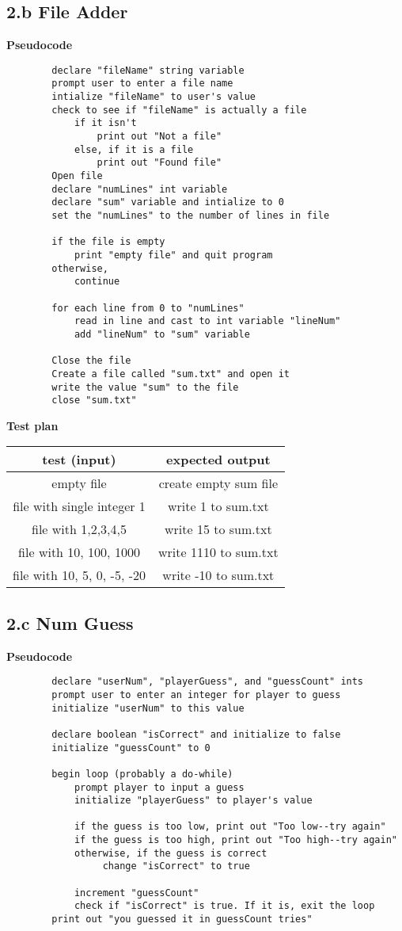 \documentclass[a4paper, 11pt]{article}
\begin{document}
\subsection*{2.b File Adder} 
	\textbf{Pseudocode} 
	\begin{lstlisting}
		declare "fileName" string variable 
		prompt user to enter a file name
		intialize "fileName" to user's value 
		check to see if "fileName" is actually a file 
			if it isn't 
				print out "Not a file" 
			else, if it is a file 
				print out "Found file" 
		Open file 
		declare "numLines" int variable 
		declare "sum" variable and intialize to 0
		set the "numLines" to the number of lines in file 
		
		if the file is empty 
			print "empty file" and quit program 
		otherwise, 
			continue 
			
		for each line from 0 to "numLines" 
			read in line and cast to int variable "lineNum" 
			add "lineNum" to "sum" variable 
		
		Close the file 
		Create a file called "sum.txt" and open it 
		write the value "sum" to the file 
		close "sum.txt" 
	\end{lstlisting}

	\textbf{Test plan} 
	\begin{center}
		\begin{tabular}{|c|c|}
			\hline
			\textbf{test (input)} & \textbf{expected output} \\ 
			\hline 
			empty file & create empty sum file \\ 
			\hline 
			file with single integer 1& write 1 to sum.txt \\ 
			\hline 
			file with 1,2,3,4,5 & write 15 to sum.txt \\ 
			\hline 
			file with 10, 100, 1000 &  write 1110 to sum.txt \\ 
			\hline 
			file with 10, 5, 0, -5, -20 & write -10 to sum.txt \\ 
			\hline 
		\end{tabular}
	\end{center}

\subsection*{2.c Num Guess} 
	\textbf{Pseudocode} 
	\begin{lstlisting}
		declare "userNum", "playerGuess", and "guessCount" ints 
		prompt user to enter an integer for player to guess 
		initialize "userNum" to this value 
		
		declare boolean "isCorrect" and initialize to false
		initialize "guessCount" to 0
		
		begin loop (probably a do-while)
			prompt player to input a guess 
			initialize "playerGuess" to player's value 
			
			if the guess is too low, print out "Too low--try again"
			if the guess is too high, print out "Too high--try again" 
			otherwise, if the guess is correct
				 change "isCorrect" to true
				 
			increment "guessCount" 
			check if "isCorrect" is true. If it is, exit the loop
		print out "you guessed it in guessCount tries" 		
	\end{lstlisting}
	
\end{document}
